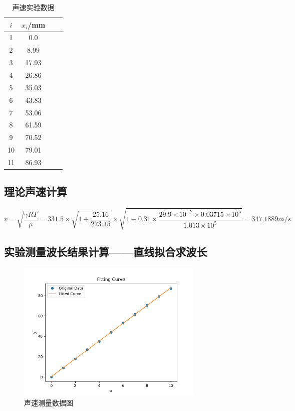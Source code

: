 \documentclass[12pt,a4paper]{amsart}
\begin{document}
            \begin{table}[htbp]
                \centering
                \caption{声速实验数据}
                \label{tab:score}
                \begin{tabular}{cccc}
                \toprule
                \textbf{$i$} & \textbf{$x_i$/mm} \\
                \midrule
                1 & 0.0 \\
                2 & 8.99 \\
                3 & 17.93 \\
                4 & 26.86 \\
                5 & 35.03 \\
                6 & 43.83 \\
                7 & 53.06 \\
                8 & 61.59 \\
                9 & 70.52 \\
                10 & 79.01 \\
                11 & 86.93 \\
                \bottomrule
                \end{tabular}
                \end{table}

\subsection{理论声速计算}

\begin{equation}
    v = \sqrt{\frac{\gamma RT}{\mu}} = 331.5 \times \sqrt{1+\frac{25.16}{273.15}}\times\sqrt{1+0.31\times\frac{29.9\times 10^{-2}\times 0.03715 \times 10^5}{1.013\times 10^5}} = 347.1889 m/s
\end{equation}

\subsection{实验测量波长结果计算——直线拟合求波长}

\begin{figure}[htbp]
    \centering
    \includegraphics[width=0.8\textwidth]{plot.png}
    \caption{声速测量数据图}
\end{figure}
\end{document}
